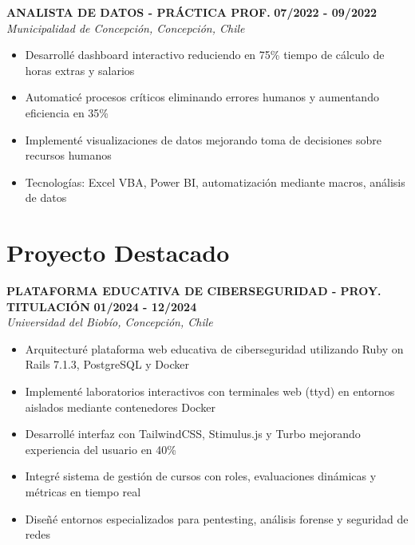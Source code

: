 \documentclass[10pt, letterpaper]{article}
\newcommand{\experiencia}[4]{
    {\bfseries\color{primario}#1} \hfill {\footnotesize\textbf{#2}}\\[0.05cm]
    {\footnotesize\textit{#3, #4}}\\[0.1cm]
}
\newcommand{\logro}[1]{
    \item {\footnotesize #1}
}
\begin{document}
\begin{multicols}{2}
\experiencia{ANALISTA DE DATOS - PRÁCTICA PROF.}{07/2022 - 09/2022}
{Municipalidad de Concepción}{Concepción, Chile}
\begin{itemize}
    \logro{Desarrollé dashboard interactivo reduciendo en 75\% tiempo de cálculo de horas extras y salarios}
    \logro{Automaticé procesos críticos eliminando errores humanos y aumentando eficiencia en 35\%}
    \logro{Implementé visualizaciones de datos mejorando toma de decisiones sobre recursos humanos}
    \logro{Tecnologías: Excel VBA, Power BI, automatización mediante macros, análisis de datos}
\end{itemize}

\section*{Proyecto Destacado}

\experiencia{PLATAFORMA EDUCATIVA DE CIBERSEGURIDAD - PROY. TITULACIÓN}{01/2024 - 12/2024}
{Universidad del Biobío}{Concepción, Chile}
\begin{itemize}
    \logro{Arquitecturé plataforma web educativa de ciberseguridad utilizando Ruby on Rails 7.1.3, PostgreSQL y Docker}
    \logro{Implementé laboratorios interactivos con terminales web (ttyd) en entornos aislados mediante contenedores Docker}
    \logro{Desarrollé interfaz con TailwindCSS, Stimulus.js y Turbo mejorando experiencia del usuario en 40\%}
    \logro{Integré sistema de gestión de cursos con roles, evaluaciones dinámicas y métricas en tiempo real}
    \logro{Diseñé entornos especializados para pentesting, análisis forense y seguridad de redes}
\end{itemize}

\end{multicols}
\end{document}
